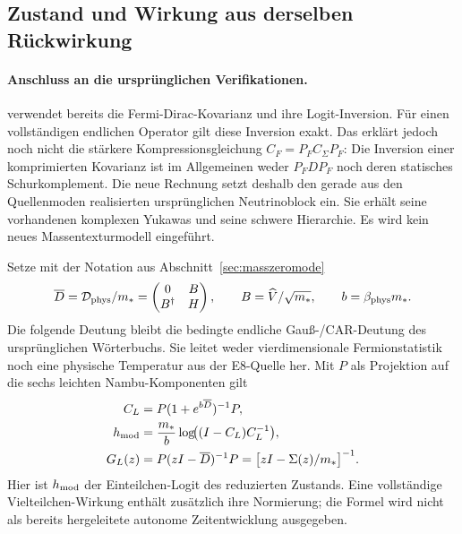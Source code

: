 \subsection{Zustand und Wirkung aus derselben Rückwirkung}\label{sec:stateactionclosure}

\paragraph{Anschluss an die ursprünglichen Verifikationen.}
 verwendet bereits
die Fermi-Dirac-Kovarianz und ihre Logit-Inversion. Für einen vollständigen
endlichen Operator gilt diese Inversion exakt. Das erklärt jedoch noch
nicht die stärkere Kompressionsgleichung
$C_F=P_F C_\Sigma P_F$: Die Inversion einer komprimierten Kovarianz
ist im Allgemeinen weder $P_FDP_F$ noch deren statisches Schurkomplement.
Die neue Rechnung setzt deshalb den gerade aus den Quellenmoden
realisierten ursprünglichen Neutrinoblock ein. Sie erhält seine vorhandenen
komplexen Yukawas und seine schwere Hierarchie. Es wird kein neues
Massentexturmodell eingeführt.

Setze mit der Notation aus Abschnitt~\ref{sec:masszeromode}
\begin{equation}
\overline D=\mathcal D_{\rm phys}/m_*=
\begin{pmatrix}0&B\\B^\dagger&H\end{pmatrix},
\qquad B=\widehat V/\sqrt{m_*},\qquad b=\beta_{\rm phys}m_*.
\end{equation}
Die folgende Deutung bleibt die bedingte endliche Gauß-/CAR-Deutung
des ursprünglichen Wörterbuchs. Sie leitet weder vierdimensionale
Fermionstatistik noch eine physische Temperatur aus der E8-Quelle her.
Mit $P$ als Projektion auf die sechs leichten Nambu-Komponenten gilt
\begin{align}
C_L&=P(1+e^{b\overline D})^{-1}P,\\
h_{\rm mod}&=\frac{m_*}{b}\log\!\bigl((I-C_L)C_L^{-1}\bigr),\\
G_L(z)&=P(zI-\overline D)^{-1}P
       =\bigl[zI-\Sigma(z)/m_*\bigr]^{-1}.
\end{align}
Hier ist $h_{\rm mod}$ der Einteilchen-Logit des reduzierten Zustands.
Eine vollständige Vielteilchen-Wirkung enthält zusätzlich ihre
Normierung; die Formel wird nicht als bereits hergeleitete autonome
Zeitentwicklung ausgegeben.

